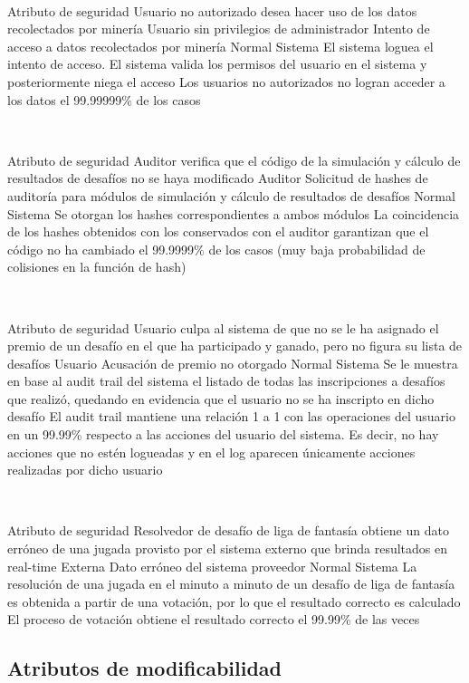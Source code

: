 ~

\escenario
{Atributo de seguridad}
{Usuario no autorizado desea hacer uso de los datos recolectados por minería}
{Usuario sin privilegios de administrador}
{Intento de acceso a datos recolectados por minería}
{Normal}
{Sistema}
{El sistema loguea el intento de acceso. El sistema valida los permisos del usuario en el sistema y posteriormente niega el acceso}
{Los usuarios no autorizados no logran acceder a los datos el 99.99999\% de los casos}

~

\escenario
{Atributo de seguridad}
{Auditor verifica que el código de la simulación y cálculo de resultados de desafíos no se haya modificado}
{Auditor}
{Solicitud de hashes de auditoría para módulos de simulación y cálculo de resultados de desafíos}
{Normal}
{Sistema}
{Se otorgan los hashes correspondientes a ambos módulos}
{La coincidencia de los hashes obtenidos con los conservados con el auditor garantizan que el código no ha cambiado el 99.9999\% de los casos (muy baja probabilidad de colisiones en la función de hash)}

~

\escenario
{Atributo de seguridad}
{Usuario culpa al sistema de que no se le ha asignado el premio de un desafío en el que ha participado y ganado, pero no figura su lista de desafíos}
{Usuario}
{Acusación de premio no otorgado}
{Normal}
{Sistema}
{Se le muestra en base al audit trail del sistema el listado de todas las inscripciones a desafíos que realizó, quedando en evidencia que el usuario no se ha inscripto en dicho desafío}
{El audit trail mantiene una relación 1 a 1 con las operaciones del usuario en un 99.99\% respecto a las acciones del usuario del sistema. Es decir, no hay acciones que no estén logueadas y en el log aparecen únicamente acciones realizadas por dicho usuario}

~

\escenario
{Atributo de seguridad}
{Resolvedor de desafío de liga de fantasía obtiene un dato erróneo de una jugada provisto por el sistema externo que brinda resultados en real-time}
{Externa}
{Dato erróneo del sistema proveedor}
{Normal}
{Sistema}
{La resolución de una jugada en el minuto a minuto de un desafío de liga de fantasía es obtenida a partir de una votación, por lo que el resultado correcto es calculado}
{El proceso de votación obtiene el resultado correcto el 99.99\% de las veces}

\subsection{Atributos de modificabilidad}

